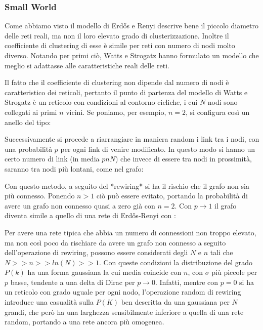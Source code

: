 
\subsubsection{Small World}
Come abbiamo visto il modello di Erdős e Renyi descrive bene il piccolo diametro delle reti reali, ma non il loro elevato grado di clusterizzazione. Inoltre il coefficiente di clustering di esse è simile per reti con numero di nodi molto diverso. Notando per primi ciò, Watts e Strogatz hanno formulato un modello che meglio si adattasse alle caratteristiche reali delle reti. 

Il fatto che il coefficiente di clustering non dipende dal numero di nodi è caratteristico dei reticoli, pertanto il punto di partenza del modello di Watts e Strogatz è un reticolo con condizioni al contorno cicliche, i cui $N$ nodi sono collegati ai primi $n$ vicini. Se poniamo, per esempio, $n = 2$, si configura così un anello del tipo:


Successivamente si procede a riarrangiare in maniera random i link tra i nodi, con una probabilità $p$ per ogni link di venire modificato. In questo modo si hanno un certo numero di link (in media $pnN$) che invece di essere tra nodi in prossimità, saranno tra nodi più lontani, come nel grafo:


Con questo metodo, a seguito del *rewiring* si ha il rischio che il grafo non sia più connesso. Ponendo $n>1$ ciò può essere evitato, portando la probabilità di avere un grafo non connesso quasi a zero già con $n=2$.
Con $p \rightarrow 1$ il grafo diventa simile a quello di una rete di Erdős-Renyi con :


Per avere una rete tipica che abbia un numero di connessioni non troppo elevato, ma non così poco da rischiare da avere un grafo non connesso a seguito dell'operazione di rewiring, possono essere considerati degli $N$ e $n$ tali che $N>>n>>ln(N)>>1$. Con queste condizioni la distribuzione del grado $P(k)$ ha una forma gaussiana la cui media coincide con $n$, con $\sigma$ più piccole per $p$ basse, tendente a una delta di Dirac per $p \rightarrow 0$. Infatti, mentre con $p=0$ si ha un reticolo con grado uguale per ogni nodo, l'operazione random di rewiring introduce una casualità sulla $P(K)$ ben descritta da una gaussiana per $N$ grandi, che però ha una larghezza sensibilmente inferiore a quella di una rete random, portando a una rete ancora più omogenea.  

